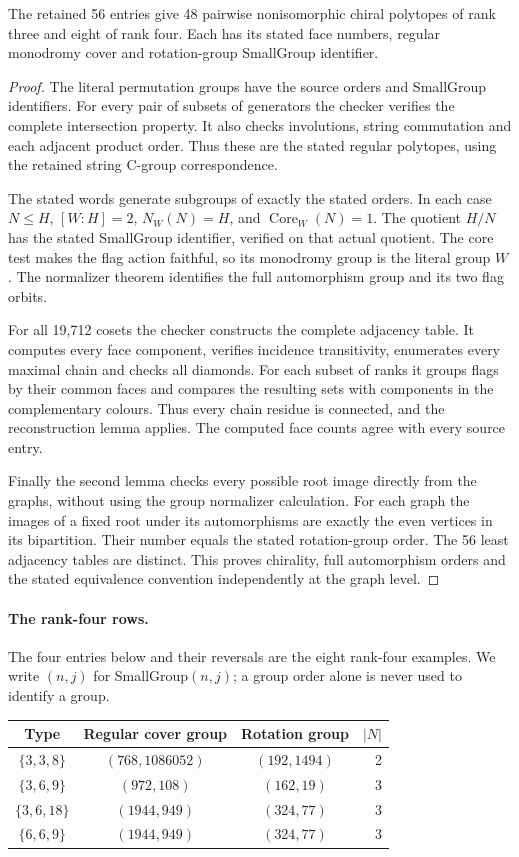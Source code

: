 \documentclass[11pt,a4paper]{article}
\begin{document}
\begin{theorem}
The retained 56 entries give 48 pairwise nonisomorphic chiral polytopes
of rank three and eight of rank four. Each has its stated face numbers,
regular monodromy cover and rotation-group SmallGroup identifier.
\end{theorem}
\begin{proof}
The literal permutation groups have the source orders and SmallGroup
identifiers. For every pair of subsets of generators the checker verifies
the complete intersection property. It also checks involutions, string
commutation and each adjacent product order. Thus these are the stated
regular polytopes, using the retained string C-group correspondence.

The stated words generate subgroups of exactly the stated orders. In
each case $N\leq H$, $[W:H]=2$, $N_W(N)=H$, and
$\operatorname{Core}_W(N)=1$. The quotient $H/N$ has the stated
SmallGroup identifier, verified on that actual quotient. The core test
makes the flag action faithful, so its monodromy group is the literal
group $W$. The normalizer theorem identifies the full automorphism
group and its two flag orbits.

For all 19,712 cosets the checker constructs the complete adjacency
table. It computes every face component, verifies incidence transitivity,
enumerates every maximal chain and checks all diamonds. For each subset
of ranks it groups flags by their common faces and compares the resulting
sets with components in the complementary colours. Thus every chain
residue is connected, and the reconstruction lemma applies. The computed
face counts agree with every source entry.

Finally the second lemma checks every possible root image directly from
the graphs, without using the group normalizer calculation. For each
graph the images of a fixed root under its automorphisms are exactly
the even vertices in its bipartition. Their number equals the stated
rotation-group order. The 56 least adjacency tables are distinct.
This proves chirality, full automorphism orders and the stated
equivalence convention independently at the graph level.
\end{proof}

\paragraph{The rank-four rows.}
The four entries below and their reversals are the eight rank-four
examples. We write $(n,j)$ for SmallGroup$(n,j)$; a group order alone
is never used to identify a group.
\begin{center}\small
\begin{tabular}{cccr}\toprule
Type&Regular cover group&Rotation group&$|N|$\\\midrule
$\{3,3,8\}$&$(768,1086052)$&$(192,1494)$&2\\
$\{3,6,9\}$&$(972,108)$&$(162,19)$&3\\
$\{3,6,18\}$&$(1944,949)$&$(324,77)$&3\\
$\{6,6,9\}$&$(1944,949)$&$(324,77)$&3\\\bottomrule
\end{tabular}\end{center}
\end{document}
